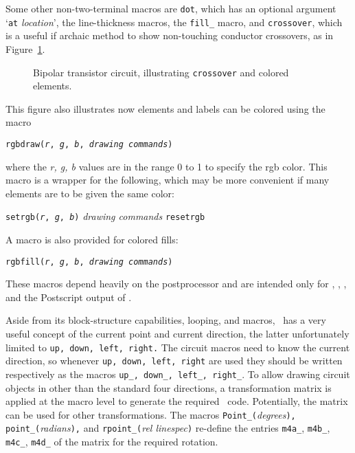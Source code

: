 Some other non-two-terminal macros are {\tt dot}, which has an
optional argument `{\tt at} {\sl location}', the line-thickness
macros, the {\tt fill\_} macro, and {\tt crossover}, which is a useful if
archaic method to show non-touching conductor crossovers, as in
Figure~\ref{bistable}.
\begin{figure}[h!t]
   
   \vspace{-1ex}
   \caption{Bipolar transistor circuit, illustrating {\tt crossover}
      and colored elements.}
   \label{bistable}
   \end{figure}
This figure also illustrates now elements and labels can be colored
using the macro

{\tt rgbdraw({\sl r}, {\sl g}, {\sl b}, {\sl drawing commands})}

\noindent
where the {\sl r, g, b} values are in the range 0 to 1 to specify the rgb color.
This macro is a wrapper for the following, which may be more convenient
if many elements are to be given the same color:

   {\tt setrgb({\sl r}, {\sl g}, {\sl b})}
      \hfill\break\hspace*{\parindent}%
   {\sl drawing commands}
      \hfill\break\hspace*{\parindent}%
   {\tt resetrgb}

A macro is also provided for colored fills:

{\tt rgbfill({\sl r}, {\sl g}, {\sl b}, {\sl drawing commands})}

\noindent%
These macros depend heavily on the postprocessor and are intended only for 
\PSTricks, \TPGF, \MetaPost, and the Postscript output of \dpic.


Aside from its block-structure capabilities, looping, and macros, 
\pic\ has a very useful concept of the current point and current direction,
the latter unfortunately limited to {\tt up, down, left, right.}
The circuit macros need to know the current direction, so
whenever {\tt up, down, left, right} are used they should be written
respectively as the macros {\tt up\_, down\_, left\_, right\_}.
To allow drawing circuit objects in other than the standard four directions,
a transformation matrix
is applied at the macro level to generate the required \pic\ code.
Potentially, the matrix can be used for other transformations.
The macros {\tt Point\_(}{\sl degrees}{\tt ),}
{\tt point\_(}{\sl radians}{\tt ),}
and {\tt rpoint\_(}{\sl rel linespec}{\tt )} re-define the entries
{\tt m4a\_}, {\tt m4b\_}, {\tt m4c\_}, {\tt m4d\_}
of the matrix for the required rotation.

